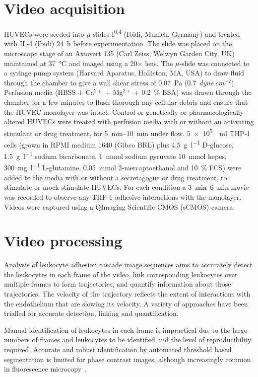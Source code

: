 \section{Video acquisition}
\label{leukocytes:acquisition}
HUVECs were seeded into $\mu$-slides I\textsuperscript{0.4} (Ibidi, Munich, Germany) and treated with IL-4 (Ibidi) \SI{24}{\hour} before experimentation. The slide was placed on the microscope stage of an Axiovert 135 (Carl Zeiss, Welwyn Garden City, UK) maintained at \SI{37}{\celsius} and imaged using a 20$\times$ lens. The $\mu$-slide was connected to a syringe pump system (Harvard Aparatus, Holliston, MA, USA) to draw fluid through the chamber to give a wall shear stress of \SI{0.07}{\pascal} (0.7~$dyne~cm^{-2}$). Perfusion media (HBSS $+$ Ca$^{2+}$ $+$ Mg$^{2+}$ $+$ 0.2~\% BSA) was drawn through the chamber for a few minutes to flush thorough any cellular debris and ensure that the HUVEC monolayer was intact. Control or genetically or pharmacologically  altered HUVECs were treated with perfusion media with or without an activating stimulant or drug treatment, for \SIrange{5}{10}{\minute} under flow. \SI{5e5}{\per\milli\litre} THP-1 cells (grown in RPMI medium 1640 (Gibco BRL) plus \SI{4.5}{\gram\per\litre} D-glucose, \SI{1.5}{\gram\per\litre} sodium bicarbonate, \SI{1}{\mmol} sodium pyruvate \SI{10}{\mmol} hepes, \SI{300}{\milli\gram\per\litre} L-glutamine, \SI{0.05}{\mmol} 2-mercaptoethanol and 10~\% FCS) were added to the media with or without a secretagogue or drug treatment, to stimulate or mock stimulate HUVECs. For each condition a \SIrange{3}{6}{\minute} movie was recorded to observe any THP-1 adhesive interactions with the monolayer. Videos were captured using a QImaging Scientific CMOS (sCMOS) camera.

\section{Video processing}
\label{leukocytes:processing}
Analysis of leukocyte adhesion cascade image sequences aims to accurately detect the leukocytes in each frame of the video, link corresponding leukocytes over multiple frames to form trajectories, and quantify information about those trajectories. The velocity of the trajectory reflects the extent of interactions with the endothelium that are slowing its velocity. A variety of approaches have been trialled for accurate detection, linking and quantification.

Manual identification of leukocytes in each frame is impractical due to the large numbers of frames and leukocytes to be identified and the level of reproducibility required. Accurate and robust identification by automated threshold based segmentation is limited for phase contrast images, although increasingly common in fluorescence microcopy~\cite{Hand2009}.

